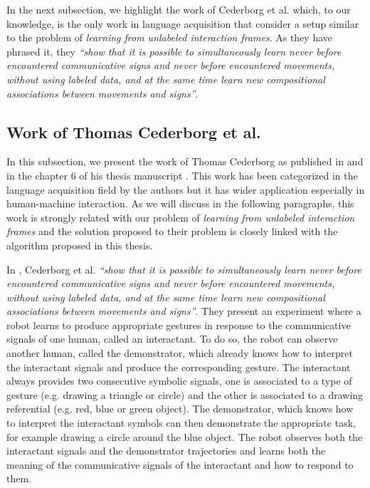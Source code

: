 In the next subsection, we highlight the work of Cederborg et al. \cite{cederborg2011imitating} which, to our knowledge, is the only work in language acquisition that consider a setup similar to the problem of \emph{learning from unlabeled interaction frames}. As they have phrased it, they \textit{``show that it is possible to simultaneously learn never before encountered communicative signs and never before encountered movements, without using labeled data, and at the same time learn new compositional associations between movements and signs''}.

\subsection{Work of Thomas Cederborg et al.}
\label{chapter:related:language:thomas}

In this subsection, we present the work of Thomas Cederborg as published in \cite{cederborg2011imitating} and in the chapter 6 of his thesis manuscript \cite{cederborg2014thesis}. This work has been categorized in the language acquisition field by the authors but it has wider application especially in human-machine interaction. As we will discuss in the following paragraphs, this work is strongly related with our problem of \emph{learning from unlabeled interaction frames} and the solution proposed to their problem is closely linked with the algorithm proposed in this thesis.

In \cite{cederborg2011imitating}, Cederborg et al. \textit{``show that it is possible to simultaneously learn never before encountered communicative signs and never before encountered movements, without using labeled data, and at the same time learn new compositional associations between movements and signs''}. They present an experiment where a robot learns to produce appropriate gestures in response to the communicative signals of one human, called an interactant. To do so, the robot can observe another human, called the demonstrator, which already knows how to interpret the interactant signals and produce the corresponding gesture. The interactant always provides two consecutive symbolic signals, one is associated to a type of gesture (e.g. drawing a triangle or circle) and the other is associated to a drawing referential (e.g. red, blue or green object). The demonstrator, which knows how to interpret the interactant symbols can then demonstrate the appropriate task, for example drawing a circle around the blue object. The robot observes both the interactant signals and the demonstrator trajectories and learns both the meaning of the communicative signals of the interactant and how to respond to them.

